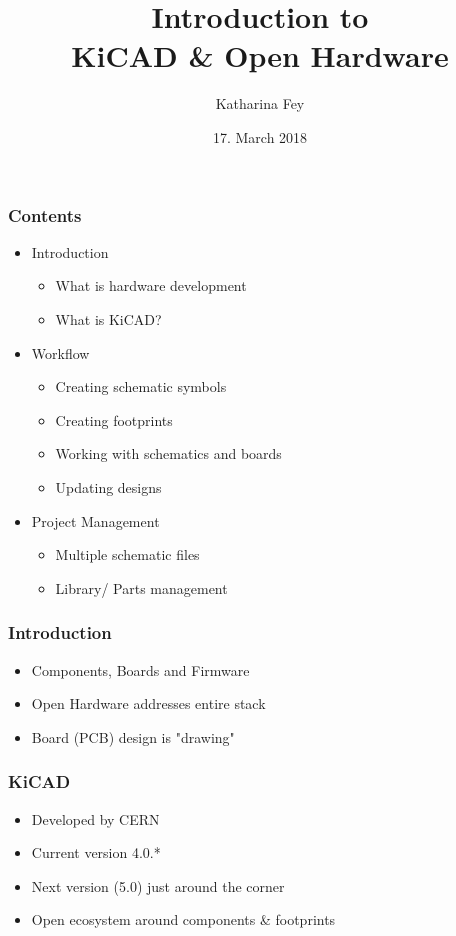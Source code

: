 \documentclass{beamer}
\begin{document}
\title{Introduction to\\KiCAD \& Open Hardware}
\author{Katharina Fey}
\date{17. March 2018}

\frame{\titlepage}


\begin{frame}
  \frametitle{Contents}
  \begin{itemize}
    \item Introduction
    \begin{itemize}
      \item What is hardware development
      \item What is KiCAD?
    \end{itemize}
    \item Workflow
    \begin{itemize}
      \item Creating schematic symbols
      \item Creating footprints
      \item Working with schematics and boards
      \item Updating designs
    \end{itemize}
    \item Project Management
    \begin{itemize}
      \item Multiple schematic files
      \item Library/ Parts management
    \end{itemize}
  \end{itemize}
\end{frame}


\begin{frame}
  \frametitle{Introduction}
  \begin{itemize}
    \item Components, Boards and Firmware
    \item Open Hardware addresses entire stack
    \item Board (PCB) design is "drawing"
  \end{itemize}
\end{frame}


\begin{frame}
  \frametitle{KiCAD}
  \begin{itemize}
    \item Developed by CERN
    \item Current version 4.0.*
    \item Next version (5.0) just around the corner
    \item Open ecosystem around components \& footprints
  \end{itemize}
\end{frame}
\end{document}
